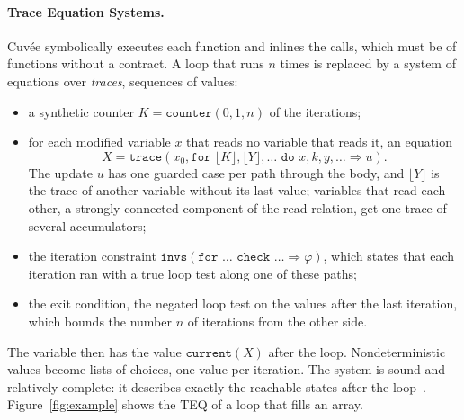 \documentclass[runningheads]{llncs}
\newcommand{\cuvee}{Cuvée}
\newcommand{\lf}[1]{\lfloor #1 \rfloor}
\newcommand{\code}[1]{\texttt{#1}}
\begin{document}
\paragraph{Trace Equation Systems.}
\cuvee{} symbolically executes each function and inlines the calls, which must be of functions without a
contract. A loop that runs $n$ times is
replaced by a system of equations over \emph{traces}, sequences of values:
\begin{itemize}
\item a synthetic counter $K = \code{counter}(0, 1, n)$ of the iterations;
\item for each modified variable $x$ that reads no variable that reads it, an equation
  \[X = \code{trace}(x_0, \code{for } \lf{K}, \lf{Y}, \dots \code{ do } x, k, y, \dots \Rightarrow u).\]
  The update $u$ has one guarded case per path through the body, and $\lf{Y}$ is the trace of another
  variable without its last value; variables that read each other, a strongly connected component of the
  read relation, get one trace of several accumulators;
\item the iteration constraint $\code{invs}(\code{for } \dots \code{ check } \dots \Rightarrow
  \varphi)$, which states that each iteration ran with a true loop test along one of these paths;
\item the exit condition, the negated loop test on the values after the last iteration, which
  bounds the number $n$ of iterations from the other side.
\end{itemize}
The variable then has the value $\code{current}(X)$ after the loop. Nondeterministic values become lists
of choices, one value per iteration. The system is sound and relatively complete: it describes exactly the reachable states after the
loop~\cite{teq}. Figure~\ref{fig:example} shows the \ac{TEQ} of a loop that fills an array.
\end{document}

